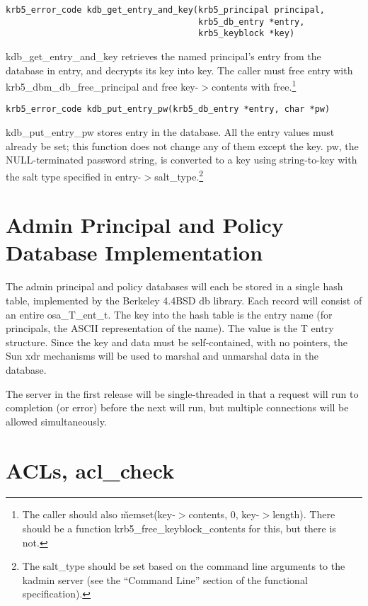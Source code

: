 \begin{verbatim}
krb5_error_code kdb_get_entry_and_key(krb5_principal principal,
                                      krb5_db_entry *entry,
                                      krb5_keyblock *key)
\end{verbatim}

kdb_get_entry_and_key retrieves the named principal's entry from the
database in entry, and decrypts its key into key.  The caller must
free entry with krb5_dbm_db_free_principal and free key-$>$contents with
free.\footnote{The caller should also \v{memset(key-$>$contents, 0,
key-$>$length)}.  There should be a function krb5_free_keyblock_contents
for this, but there is not.}

\begin{verbatim}
krb5_error_code kdb_put_entry_pw(krb5_db_entry *entry, char *pw)
\end{verbatim}

kdb_put_entry_pw stores entry in the database.  All the entry values
must already be set; this function does not change any of them except
the key.  pw, the NULL-terminated password string, is converted to a
key using string-to-key with the salt type specified in
entry-$>$salt_type.\footnote{The salt_type should be set based on the
command line arguments to the kadmin server (see the ``Command Line''
section of the functional specification).}

\section{Admin Principal and Policy Database Implementation}

The admin principal and policy databases will each be stored in a
single hash table, implemented by the Berkeley 4.4BSD db library.
Each record will consist of an entire osa_T_ent_t.  The key into the
hash table is the entry name (for principals, the ASCII representation
of the name).  The value is the T entry structure.  Since the key and
data must be self-contained, with no pointers, the Sun xdr mechanisms
will be used to marshal and unmarshal data in the database.

The server in the first release will be single-threaded in that a
request will run to completion (or error) before the next will run,
but multiple connections will be allowed simultaneously.

\section{ACLs, acl_check}

